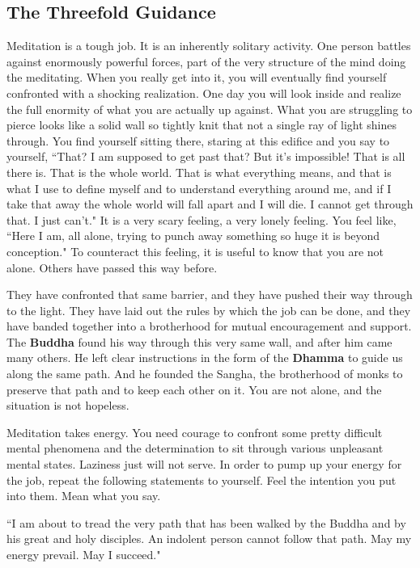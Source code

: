 \subsection*{The Threefold Guidance }
Meditation is a tough job. It is an inherently solitary
activity. One person battles against enormously powerful forces, part of the
very structure of the mind doing the meditating. When you really get into it,
you will eventually find yourself confronted with a shocking realization. One
day you will look inside and realize the full enormity of what you are actually
up against. What you are struggling to pierce looks like a solid wall so tightly
knit that not a single ray of light shines through. You find yourself sitting
there, staring at this edifice and you say to yourself, ``That? I am supposed to
get past that? But it's impossible! That is all there is. That is the whole
world. That is what everything means, and that is what I use to define myself
and to understand everything around me, and if I take that away the whole world
will fall apart and I will die. I cannot get through that. I just can't." It is
a very scary feeling, a very lonely feeling. You feel like, ``Here I am, all
alone, trying to punch away something so huge it is beyond conception." To
counteract this feeling, it is useful to know that you are not alone. Others
have passed this way before.

They have confronted that same barrier, and they have pushed their way through
to the light. They have laid out the rules by which the job can be done, and
they have banded together into a brotherhood for mutual encouragement and
support. The \textbf{Buddha} found his way through this very same wall, and after him
came many others. He left clear instructions in the form of the \textbf{Dhamma} to guide
us along the same path. And he founded the Sangha, the brotherhood of monks to
preserve that path and to keep each other on it. You are not alone, and the
situation is not hopeless.

Meditation takes energy. You need courage to confront some pretty difficult
mental phenomena and the determination to sit through various unpleasant mental
states. Laziness just will not serve. In order to pump up your energy for the
job, repeat the following statements to yourself. Feel the intention you put
into them. Mean what you say.

``I am about to tread the very path that has been walked by the Buddha and by his
great and holy disciples. An indolent person cannot follow that path. May my
energy prevail. May I succeed." 

